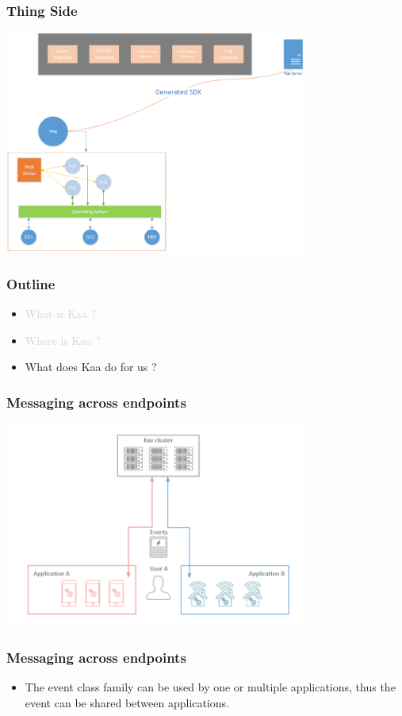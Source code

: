 \documentclass{beamer}
\begin{document}
\begin{frame}
	\frametitle{Thing Side}
	\centering\includegraphics[width=10cm]{diags/kaa-arch-2.png}
\end{frame}

\begin{frame}
	\frametitle{Outline}
	\begin{itemize}
		\item \textcolor{LightGray}{What is Kaa ?}
		\item \textcolor{LightGray}{Where is Kaa ?}
		\item What does Kaa do for us ?
	\end{itemize}
\end{frame}

\begin{frame}
	\frametitle{Messaging across endpoints}
	\centering\includegraphics[width=10cm]{figs/messaging.png}
\end{frame}

\begin{frame}
	\frametitle{Messaging across endpoints}
	\begin{itemize}
		\item The event class family can be used by one or multiple applications,
			thus the \textcolor{TextOrange}{event can be shared between applications}.
	\end{itemize}
\end{frame}
\end{document}
